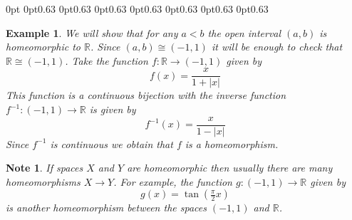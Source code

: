 \documentclass[11pt, letterpaper, oneside]{report}
\theoremstyle{pplain}
\newtheorem{ITERMVALUE THM}[theorem]{Intermediate Value Theorem}
\newtheorem{HEINEBOREL THM}[theorem]{Heine-Borel Theorem}
\newtheorem{UMETR THM}[theorem]{Urysohn Metrization Theorem}
\newtheorem{UMETR2 THM}[theorem]{Urysohn Metrization Theorem (v.2)}
\theoremstyle{ddefinition}
\newtheorem{example}[theorem]{Example}
\newtheorem{note}[theorem]{Note}
\theoremstyle{nnn}
\newtheorem{TDA NN}[theorem]{Topological Data Analysis. }
\theoremstyle{eexercise}
\newcommand{\R}{{\mathbb R}}
\begin{document}
{}
0pt\textwidth
0pt\textwidth
0pt\textwidth
0pt0.63\textwidth
0pt0.63\textwidth
0pt0.63\textwidth
0pt0.63\textwidth
0pt0.63\textwidth
0pt0.63\textwidth
0pt0.63\textwidth
0pt\textwidth
\begin{example}
We will show that for any $a<b$ the open interval $(a, b)$ is homeomorphic to $\R$. 
Since $(a, b)\cong (-1, 1)$ it will be enough to check that $\R\cong (-1, 1)$. Take the function 
$f\colon \R\to (-1, 1)$ given by 
$$f(x) = \frac{x}{1+ |x|}$$
This function is a continuous bijection with the inverse function $f^{-1}\colon (-1, 1)\to \R$ is given by 
$$f^{-1}(x)= \dfrac{x}{1 - |x|} $$
Since $f^{-1}$ is continuous
we obtain that $f$ is a homeomorphism. 
\end{example}

\begin{note}
If spaces $X$ and $Y$ are homeomorphic then usually there are  many homeomorphisms 
$X\to Y$. For example, the function $g\colon (-1, 1)\to \R$ given by 
$$g(x) = \tan\left(\tfrac{\pi}{2} x\right)$$ 
is another homeomorphism between the spaces $(-1, 1)$ and $\R$. 
\end{note}
\end{document}
